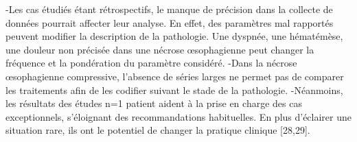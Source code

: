 \documentclass[./discussion]{subfiles}
\begin{document}
-Les cas étudiés étant rétrospectifs, le manque de précision dans la collecte de données pourrait affecter leur analyse. En effet, des paramètres mal rapportés peuvent modifier la description de la pathologie. Une dyspnée, une hématémèse, une douleur non précisée dans une nécrose œsophagienne peut changer la fréquence et la pondération du paramètre considéré.
-Dans la nécrose œsophagienne compressive, l’absence de séries larges ne permet pas de comparer les traitements afin de les codifier suivant le stade de la pathologie.
-Néanmoins, les résultats des études n=1 patient aident à la prise en charge des cas exceptionnels, s’éloignant des recommandations habituelles. En plus d’éclairer une situation rare, ils ont le potentiel de changer la pratique clinique [28,29].
\end{document}

